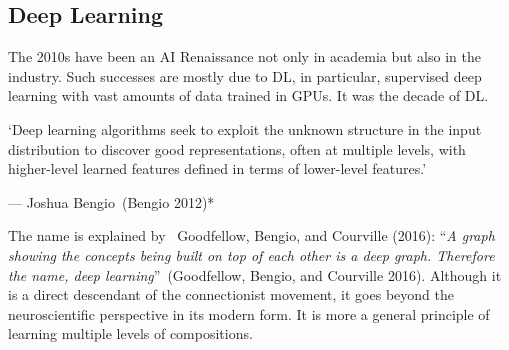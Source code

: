 \documentclass[
  letterpaper,
  12pt,
  british]{tufte-book}
\renewenvironment{quote}{
  \list{}{\leftmargin=3.5cm\topsep=0pt}
  \item\relax\small\itshape
}
{\endlist}
\theoremstyle{plain}
\theoremstyle{plain}
\theoremstyle{definition}
\theoremstyle{remark}
\begin{document}
\hypertarget{deep-learning}{%
\subsection{Deep Learning}\label{deep-learning}}

The 2010s have been an AI Renaissance not only in academia but also in
the industry. Such successes are mostly due to {DL}, in particular,
supervised deep learning with vast amounts of data trained in {GPUs}. It
was the decade of {DL}.

\begin{quote}
`Deep learning algorithms seek to exploit the unknown structure in the
input distribution to discover good representations, often at multiple
levels, with higher-level learned features defined in terms of
lower-level features.'

--- Joshua Bengio~(Bengio
2012)*
\end{quote}

The name is explained by ~Goodfellow, Bengio, and Courville
(2016):
``\emph{A graph showing the concepts being built on top of each other is
a deep graph. Therefore the name, deep learning}''~(Goodfellow, Bengio,
and Courville
2016).
Although it is a direct descendant of the connectionist movement, it
goes beyond the neuroscientific perspective in its modern form. It is
more a general principle of learning multiple levels of compositions.
\end{document}
